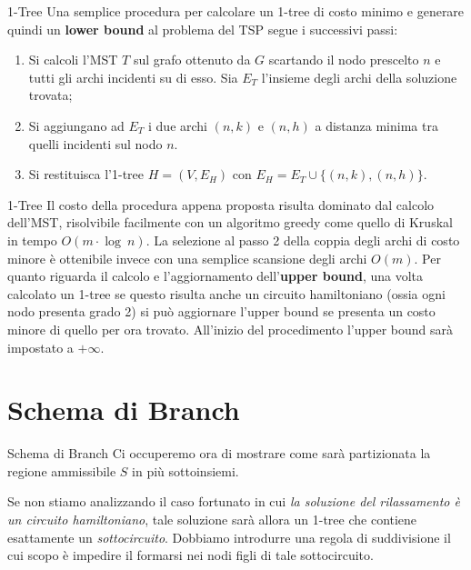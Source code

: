 \documentclass[10pt]{beamer}
\begin{document}
    \begin{frame}{1-Tree}
        Una semplice procedura per calcolare un 1-tree di costo minimo e generare quindi un \textbf{lower bound} al problema del TSP segue i successivi passi:
        \begin{enumerate}[<+->]
            \item Si calcoli l'MST $T$ sul grafo ottenuto da $G$ scartando il nodo prescelto $n$ e tutti gli archi incidenti su di esso.
            Sia $E_T$ l'insieme degli archi della soluzione trovata;
            \item Si aggiungano ad $E_T$ i due archi $(n,k)$ e $(n,h)$ a distanza minima tra quelli incidenti sul nodo $n$.
            \item Si restituisca l'1-tree $H = (V, E_H)$ con $E_H = E_T \cup \{(n,k),(n,h)\}$.
        \end{enumerate}
    \end{frame}

    \begin{frame}{1-Tree}
        Il costo della procedura appena proposta risulta dominato dal calcolo dell'MST, risolvibile facilmente con un algoritmo greedy come quello di Kruskal in tempo $O(m\cdot \log\: n)$.
        La selezione al passo 2 della coppia degli archi di costo minore è ottenibile invece con una semplice scansione degli archi $O(m)$.
        \newline
        \newline
        Per quanto riguarda il calcolo e l'aggiornamento dell'\textbf{upper bound}, una volta calcolato un 1-tree se questo risulta anche un circuito hamiltoniano (ossia ogni nodo presenta grado 2) si può aggiornare l'upper bound se presenta un costo minore di quello per ora trovato.
        All'inizio del procedimento l'upper bound sarà impostato a $ + \infty$.
    \end{frame}


    \section{Schema di Branch}\label{sec:schema-di-branch}
    \begin{frame}{Schema di Branch}
        Ci occuperemo ora di mostrare come sarà partizionata la regione ammissibile $S$ in più sottoinsiemi.

        Se non stiamo analizzando il caso fortunato in cui \textit{la soluzione del rilassamento è un circuito hamiltoniano}, tale soluzione sarà allora un 1-tree che contiene esattamente un \textit{sottocircuito}.
        Dobbiamo introdurre una regola di suddivisione il cui scopo è impedire il formarsi nei nodi figli di tale sottocircuito.
    \end{frame}
\end{document}
